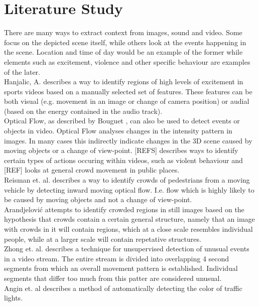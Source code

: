 \section{Literature Study}
%
There are many ways to extract context from images, sound and video. Some focus on the depicted scene itself, while others look at the events happening in the scene. Location and time of day would be an example of the former while elements such as excitement, violence and other specific behaviour are examples of the later.\\
Hanjalic, A. \cite{citeulike:405480} describes a way to identify regions of high levels of excitement in sports videos based on a manually selected set of features. These features can be both visual (e.g. movement in an image or change of camera position) or audial (based on the energy contained in the audio track).\\
Optical Flow, as described by Bouguet \cite{Bouguet2000}, can also be used to detect events or objects in video. Optical Flow analyses changes in the intensity pattern in images. In many cases this indirectly indicate changes in the 3D scene caused by moving objects or a change of view-point. [REFS] describes ways to identify certain types of actions occuring within videos, such as violent behaviour and [REF] looks at general crowd movement in public places.\\
Reisman et. al. \cite{CrowdDetectionInVideoSequences} describes a way to identify crowds of pedestrians from a moving vehicle by detecting inward moving optical flow. I.e. flow which is highly likely to be caused by moving objects and not a change of view-point.\\
Arandjelović \cite{Arandjelovic08crowddetection} attempts to identify crowded regions in still images based on the hypothesis that crowds contain a certain general structure, namely that an image with crowds in it will contain regions, which at a close scale resembles individual people, while at a larger scale will contain repetative structures.\\
Zhong et. al. \cite{10.1109/CVPR.2004.78} describes a technique for unsupervised detection of unusual events in a video stream. The entire stream is divided into overlapping 4 second segments from which an overall movement pattern is established. Individual segments that differ too much from this patter are considered unusual.\\
Angin et. al \cite{10.1109/MDM.2010.71} describes a method of automatically detecting the color of traffic lights. %
%
